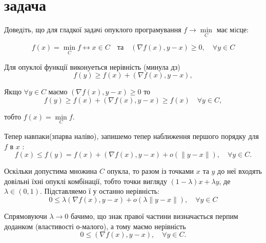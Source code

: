 \section{задача}

\begin{tcolorbox}[title=Умова]
    Доведiть, що для гладкої задачi опуклого програмування $f \rightarrow \min\limits_C$ має мiсце:

    $$ f(x) = \min\limits_C f \leftrightarrow x \in C \quad 
    \text{та} \quad (\nabla f(x),  y - x) \geq 0, \quad \forall y \in C$$
\end{tcolorbox}

Для опуклої функції виконуеться нерівність (минула дз)
$$
f(y) \geq f(x)+(\nabla f(x), y-x),
$$

Якщо $\forall y \in C$ маємо $(\nabla f(x), y-x) \geq 0$ то
$$
f(y) \geq f(x)+(\nabla f(x), y-x) \geq f(x) \quad \forall y \in C,
$$

тобто $f(x)=\min\limits_C f$.


Тепер навпаки(зпарва наліво), запишемо тепер наближення першого порядку для $f$ в $x$ :
$$
f(x) \leq f(y)=f(x)+(\nabla f(x), y-x)+o(\|y-x\|), \quad \forall y \in C .
$$

Оскільки допустима множина $C$ опукла, то разом із точками $x$ та $y$ до неї входять довільні їхні опуклі комбінації, тобто точки вигляду $(1-\lambda) x+\lambda y$, де $\lambda \in(0,1)$. Підставляемо ї у останно нерівність:
$$
0 \leq \lambda(\nabla f(x), y-x)+o(\lambda\|y-x\|), \quad \forall y \in C
$$

Спрямовуючи $\lambda \rightarrow 0$ бачимо, що знак правої частини визначається перпим доданком (властивості о-малого), а тому маємо нерівність
$$
0 \leq(\nabla f(x), y-x), \quad \forall y \in C .
$$